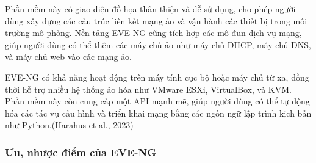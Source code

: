 \documentclass[13pt]{article}
\begin{document}
Phần mềm này có giao diện đồ họa thân thiện và dễ sử dụng, cho phép người dùng xây dựng các cấu trúc liên kết mạng ảo và vận hành các thiết bị trong môi trường mô phỏng. Nền tảng EVE-NG cũng tích hợp các mô-đun dịch vụ mạng, giúp người dùng có thể thêm các máy chủ ảo như máy chủ DHCP, máy chủ DNS, và
máy chủ web vào các mạng ảo.

EVE-NG có khả năng hoạt động trên máy tính cục bộ hoặc máy chủ từ xa, đồng thời hỗ trợ nhiều hệ thống ảo hóa như VMware ESXi, VirtualBox, và KVM. Phần mềm này còn cung cấp một API mạnh mẽ, giúp người dùng có thể tự động hóa các tác vụ cấu hình và triển khai mạng bằng các ngôn ngữ lập trình kịch bản như Python.(Harahus et al., 2023)

\subsubsection{Ưu, nhược điểm của EVE-NG}
\end{document}
